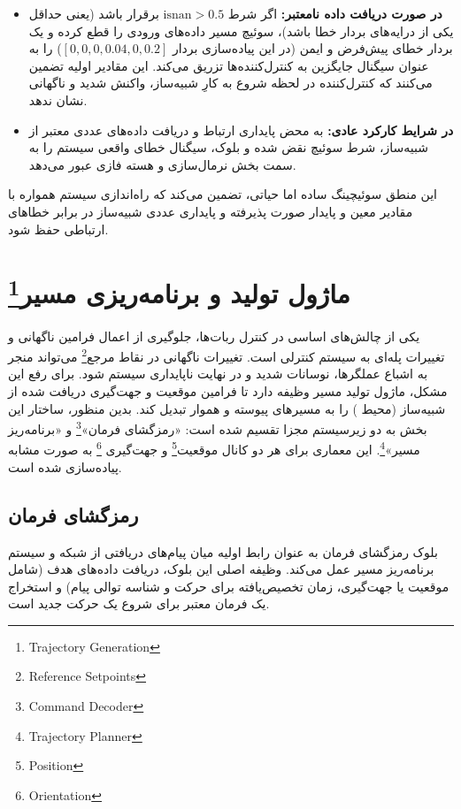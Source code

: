 	\begin{itemize}
		\item \textbf{در صورت دریافت داده نامعتبر:} اگر شرط $\mathrm{isnan} > 0.5$ برقرار باشد (یعنی حداقل یکی از درایه‌های بردار خطا  باشد)، سوئیچ مسیر داده‌های ورودی را قطع کرده و یک بردار خطای پیش‌فرض و ایمن (در این پیاده‌سازی بردار $[0, 0, 0, 0.04, 0, 0.2]$) را به عنوان سیگنال جایگزین به کنترل‌کننده‌ها تزریق می‌کند. این مقادیر اولیه تضمین می‌کنند که کنترل‌کننده در لحظه شروع به کارِ شبیه‌ساز، واکنش شدید و ناگهانی نشان ندهد.
		\item \textbf{در شرایط کارکرد عادی:} به محض پایداری ارتباط و دریافت داده‌های عددی معتبر از شبیه‌ساز، شرط سوئیچ نقض شده و بلوک، سیگنال خطای واقعی سیستم را به سمت بخش نرمال‌سازی و هسته فازی عبور می‌دهد.
	\end{itemize}
	
	
	این منطق سوئیچینگ ساده اما حیاتی، تضمین می‌کند که راه‌اندازی سیستم همواره با مقادیر معین و پایدار صورت پذیرفته و پایداری عددی شبیه‌ساز در برابر خطاهای ارتباطی حفظ شود.
	
	\section[ماژول تولید و برنامه‌ریزی مسیر]{ماژول تولید و برنامه‌ریزی مسیر\footnote{Trajectory Generation}}
	\label{sec:method-trajectory}
	
	یکی از چالش‌های اساسی در کنترل ربات‌ها، جلوگیری از اعمال فرامین ناگهانی و تغییرات پله‌ای به سیستم کنترلی است. تغییرات ناگهانی در نقاط مرجع\footnote{Reference Setpoints} می‌تواند منجر به اشباع عملگرها، نوسانات شدید و در نهایت ناپایداری سیستم شود. برای رفع این مشکل، ماژول تولید مسیر وظیفه دارد تا فرامین موقعیت و جهت‌گیری دریافت شده از شبیه‌ساز (محیط ) را به مسیرهای پیوسته و هموار تبدیل کند. بدین منظور، ساختار این بخش به دو زیرسیستم مجزا تقسیم شده است: «رمزگشای فرمان»\footnote{Command Decoder} و «برنامه‌ریز مسیر»\footnote{Trajectory Planner}. این معماری برای هر دو کانال موقعیت\footnote{Position} و جهت‌گیری
	\footnote{Orientation} به صورت مشابه پیاده‌سازی شده است.
	
	\subsection{رمزگشای فرمان}
	\label{subsec:method-command-decoder}
	بلوک رمزگشای فرمان به عنوان رابط اولیه میان پیام‌های دریافتی از شبکه  و سیستم برنامه‌ریز مسیر عمل می‌کند. وظیفه اصلی این بلوک، دریافت داده‌های هدف (شامل موقعیت یا جهت‌گیری، زمان تخصیص‌یافته برای حرکت و شناسه توالی پیام) و استخراج یک فرمان معتبر برای شروع یک حرکت جدید است. 
	
